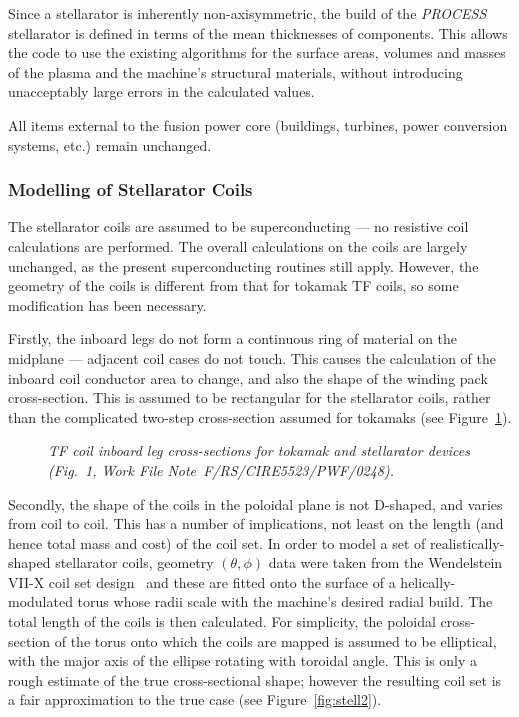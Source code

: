 \documentclass[11pt,a4paper]{report}
\newcommand{\PS}{\mbox{\it PROCESS\/ }}
\begin{document}
Since a stellarator is inherently non-axisymmetric, the build of the \PS
stellarator is defined in terms of the mean thicknesses of components. This
allows the code to use the existing algorithms for the surface areas, volumes
and masses of the plasma and the machine's structural materials, without
introducing unacceptably large errors in the calculated values.

All items external to the fusion power core (buildings, turbines, power
conversion systems, etc.) remain unchanged.

\subsubsection{Modelling of Stellarator Coils}
The stellarator coils are assumed to be superconducting --- no resistive coil
calculations are performed.  The overall calculations on the coils are largely
unchanged, as the present superconducting routines still apply. However, the
geometry of the coils is different from that for tokamak TF coils, so some
modification has been necessary.

Firstly, the inboard legs do not form a continuous ring of material on the
midplane --- adjacent coil cases do not touch. This causes the calculation of
the inboard coil conductor area to change, and also the shape of the winding
pack cross-section. This is assumed to be rectangular for the stellarator
coils, rather than the complicated two-step cross-section assumed for tokamaks
(see Figure~\ref{fig:stell1}).

\begin{figure}
\vspace*{180mm}
\caption[tosh]{\it TF coil inboard leg cross-sections for tokamak and
stellarator devices (Fig.~1, Work File Note~F/RS/CIRE5523/PWF/0248).}
\label{fig:stell1}
\end{figure}

Secondly, the shape of the coils in the poloidal plane is not D-shaped, and
varies from coil to coil. This has a number of implications, not least on the
length (and hence total mass and cost) of the coil set. In order to model a
set of realistically-shaped stellarator coils, geometry $(\theta,\phi)$ data
were taken from the Wendelstein VII-X coil set design~\cite{W7X} and these are
fitted onto the surface of a helically-modulated torus whose radii scale with
the machine's desired radial build. The total length of the coils is then
calculated. For simplicity, the poloidal cross-section of the torus onto which
the coils are mapped is assumed to be elliptical, with the major axis of the
ellipse rotating with toroidal angle. This is only a rough estimate of the
true cross-sectional shape; however the resulting coil set is a fair
approximation to the true case (see Figure~\ref{fig:stell2}).
\end{document}
